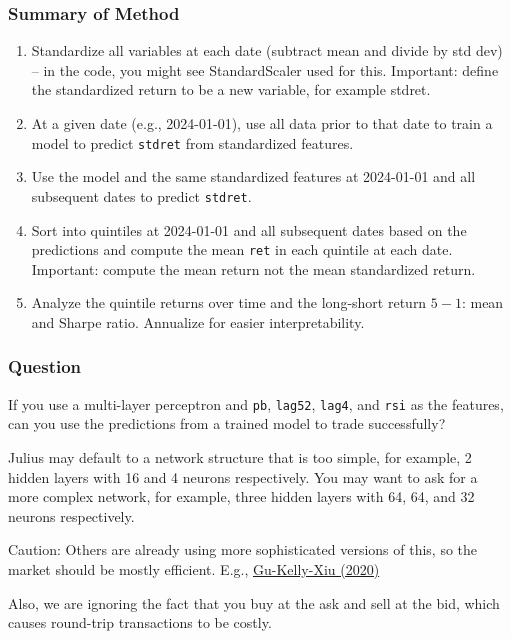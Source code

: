 \documentclass[10pt]{beamer}
\begin{document}
\begin{frame}[fragile]\frametitle{Summary of Method}
\begin{enumerate}
\item Standardize all variables at each date (subtract mean and divide by std dev) -- in the code, you might see StandardScaler used for this.  \alert{Important: define the standardized return to be a new variable, for example stdret.}
\item At a given date (e.g., 2024-01-01), use all data prior to that date to train a model to predict \verb!stdret! from standardized features.
\item Use the model and the same standardized features at 2024-01-01 and all subsequent dates to predict \verb!stdret!.
\item Sort into quintiles at 2024-01-01 and all subsequent dates based on the predictions and compute the mean \verb!ret! in each quintile at each date.  \alert{Important: compute the mean return not the mean standardized return.}
\item Analyze the quintile returns over time and the long-short return $5-1$: mean and Sharpe ratio.  Annualize for easier interpretability.
\end{enumerate}
\end{frame}

\begin{frame}[fragile]\frametitle{Question}
    If you use a multi-layer perceptron and \verb!pb!, \verb!lag52!, \verb!lag4!, and \verb!rsi! as the features, can you use the predictions from a trained model to trade successfully? 
    
    \vspace{1em}
    Julius may default to a network structure that is too simple, for example, 2 hidden layers with 16 and 4 neurons respectively.  You may want to ask for a more complex network, for example, three hidden layers with 64, 64, and 32 neurons respectively.
    \vspace{1em}

    \alert{Caution: Others are already using more sophisticated versions of this, so the market should be mostly efficient.  E.g., \href{https://mgmt675-2024.kerryback.com/assets/Gu_Kelly_Xiu_RFS_2020.pdf}{Gu-Kelly-Xiu (2020)}}
    \vspace{1em}
    
    \alert{Also, we are ignoring the fact that you buy at the ask and sell at the bid, which causes round-trip transactions to be costly.}
\end{frame}
\end{document}
